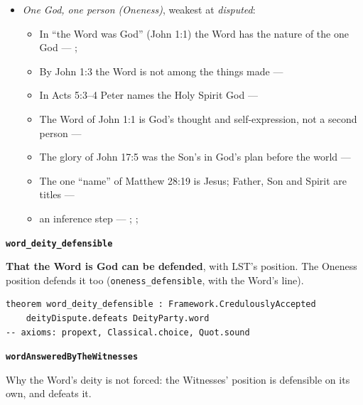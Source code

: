 \documentclass[11pt,paper=\testimonypaper,DIV=13,parskip=false]{scrartcl}
\begin{document}
\begin{itemize}
\begin{itemize}
\item an inference step --- \cite[23]{watchtower-should-you-believe-trinity-1989}; \cite[122--123]{roberts-christendom-astray}
\end{itemize}
\item \emph{One God, one person (Oneness)}, weakest at \emph{disputed}:
\begin{itemize}
\item In “the Word was God” (John 1:1) the Word has the nature of the one God --- \cite{harner-qualitative-anarthrous-1973}; \cite[3, The Triune God]{kibbey-living-systematic-theology-2026}
\item By John 1:3 the Word is not among the things made --- \cite[Tractates on John I.11]{schaff-nicene-post-nicene-fathers-1-7}
\item In Acts 5:3–4 Peter names the Holy Spirit God --- \cite[198]{calvin-commentary-acts-1844}
\item The Word of John 1:1 is God’s thought and self-expression, not a second person --- \cite[ch. 4 and 8, on John 1:1]{bernard-oneness-of-god-1983}
\item The glory of John 17:5 was the Son’s in God’s plan before the world --- \cite[ch. 8, The Preexistence of Jesus]{bernard-oneness-of-god-1983}
\item The one “name” of Matthew 28:19 is Jesus; Father, Son and Spirit are titles --- \cite[ch. 6, Matthew 28:19]{bernard-oneness-of-god-1983}
\item an inference step --- \cite[3, The Triune God]{kibbey-living-systematic-theology-2026}; \cite[ch. 4, Conclusion]{bernard-oneness-of-god-1983}; \cite[17--19]{buzzard-caveat-lector-2001}
\end{itemize}
\end{itemize}
\par\medskip\noindent\textbf{\texttt{word\_\allowbreak{}deity\_\allowbreak{}defensible}}\par\nobreak\noindent
\textbf{That the Word is God can be defended}, with LST’s position. The Oneness position defends it too (\texttt{oneness\_\allowbreak{}defensible}, with the Word’s line).

{\small\begin{verbatim}
theorem word_deity_defensible : Framework.CredulouslyAccepted
    deityDispute.defeats DeityParty.word
-- axioms: propext, Classical.choice, Quot.sound
\end{verbatim}}
\par\medskip\noindent\textbf{\texttt{word\allowbreak{}Answered\allowbreak{}By\allowbreak{}The\allowbreak{}Witnesses}}\par\nobreak\noindent
Why the Word’s deity is not forced: the Witnesses’ position is defensible on its own, and defeats it.
\end{document}
